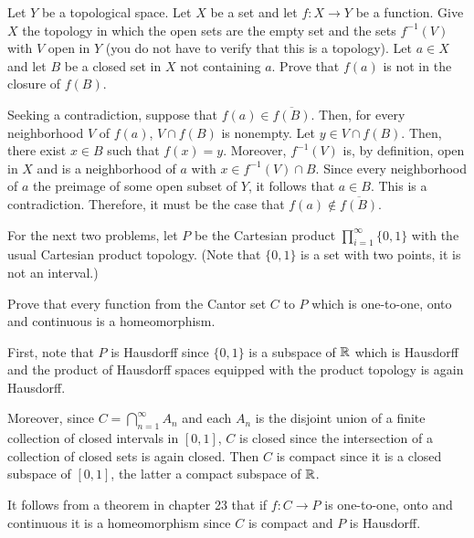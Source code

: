 \begin{problem}
  Let $Y$ be a topological space. Let $X$ be a set and let $f\colon X\to Y$
  be a function. Give $X$ the topology in which the open sets are the empty
  set and the sets $f^{-1}(V)$ with $V$ open in $Y$ (you do not have to
  verify that this is a topology). Let $a\in X$ and let $B$ be a closed set
  in $X$ not containing $a$. Prove that $f(a)$ is not in the closure of
  $f(B)$.
\end{problem}
\begin{solution}
  Seeking a contradiction, suppose that $f(a)\in\overline{f(B)}$. Then, for
  every neighborhood $V$ of $f(a)$, $V\cap f(B)$ is nonempty. Let
  $y\in V\cap f(B)$. Then, there exist $x\in B$ such that
  $f(x)=y$. Moreover, $f^{-1}(V)$ is, by definition, open in $X$ and is a
  neighborhood of $a$ with $x\in f^{-1}(V)\cap B$. Since every neighborhood
  of $a$ the preimage of some open subset of $Y$, it follows that $a\in
  B$. This is a contradiction. Therefore, it must be the case that
  $f(a)\notin\overline{f(B)}$.
\end{solution}

For the next two problems, let $P$ be the Cartesian product
$\prod_{i=1}^\infty\{0,1\}$ with the usual Cartesian product
topology. (Note that $\{0,1\}$ is a set with two points, it is not an
interval.)
\begin{problem}
  Prove that every function from the Cantor set $C$ to $P$ which is
  one-to-one, onto and continuous is a homeomorphism.
\end{problem}
\begin{solution}
  First, note that $P$ is Hausdorff since $\{0,1\}$ is a subspace of $\mathbb{R}$
  which is Hausdorff and the product of Hausdorff spaces equipped with the
  product topology is again Hausdorff.

  Moreover, since $C=\bigcap_{n=1}^\infty A_n$ and each $A_n$ is the
  disjoint union of a finite collection of closed intervals in $[0,1]$, $C$
  is closed since the intersection of a collection of closed sets is again
  closed. Then $C$ is compact since it is a closed subspace of $[0,1]$, the
  latter a compact subspace of $\mathbb{R}$.

  It follows from a theorem in chapter 23 that if $f\colon C\to P$ is
  one-to-one, onto and continuous it is a homeomorphism since $C$ is
  compact and $P$ is Hausdorff.
\end{solution}

